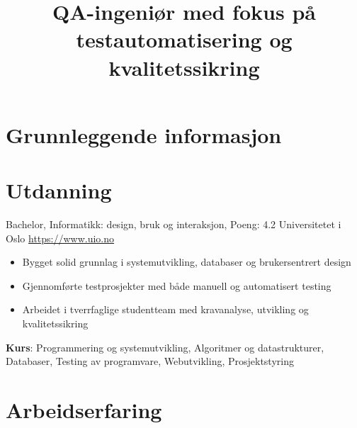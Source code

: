 \documentclass[a4paper, serif, 10pt]{moderncv}
\title{QA-ingeniør med fokus på testautomatisering og kvalitetssikring}
\begin{document}
\maketitle

\section{Grunnleggende informasjon}

\section{Utdanning}

        {Bachelor, Informatikk: design, bruk og interaksjon, Poeng: 4.2}
        {Universitetet i Oslo}
        {\url{https://www.uio.no}}
        {}
        {\begin{itemize}
\item Bygget solid grunnlag i systemutvikling, databaser og brukersentrert design
\item Gjennomførte testprosjekter med både manuell og automatisert testing
\item Arbeidet i tverrfaglige studentteam med kravanalyse, utvikling og kvalitetssikring
\end{itemize}
\textbf{Kurs}: Programmering og systemutvikling, Algoritmer og datastrukturer, Databaser, Testing av programvare, Webutvikling, Prosjektstyring}
\section{Arbeidserfaring}
\end{document}
